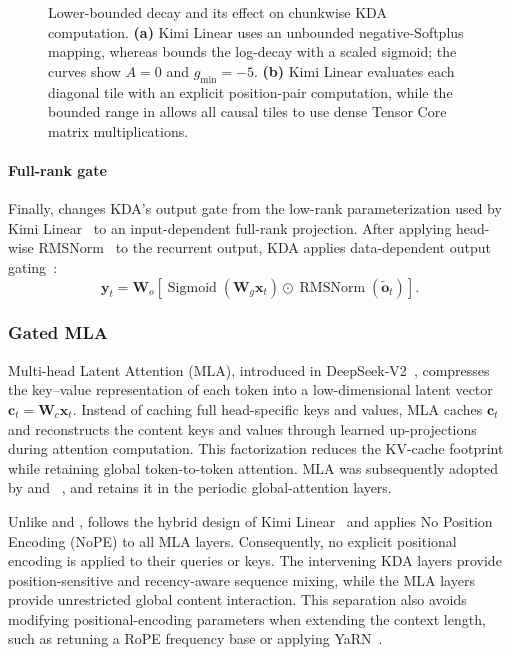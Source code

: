 \begin{figure}[t]
    \centering
    
    \caption{Lower-bounded decay and its effect on chunkwise KDA computation.
        \textbf{(a)} Kimi Linear uses an unbounded negative-Softplus mapping, whereas  bounds the log-decay with a scaled sigmoid; the curves show $A=0$ and $g_{\min}=-5$.
        \textbf{(b)} Kimi Linear evaluates each diagonal tile with an explicit position-pair computation, while the bounded range in  allows all causal tiles to use dense Tensor Core matrix multiplications.}
    \label{fig:kda-lower-bound}
\end{figure}

\paragraph{Full-rank gate}
Finally,  changes KDA's output gate from the low-rank parameterization used by Kimi Linear~\citep{team2025kimi} to an input-dependent full-rank projection.
After applying head-wise RMSNorm~\citep{zhang2019root} to the recurrent output, KDA applies data-dependent output gating~\citep{qiu2025gated}:
\begin{equation}
    \bm{y}_t
    = \mathbf{W}_o\!\left[
        \operatorname{Sigmoid}\!\left(\mathbf{W}_g\bm{x}_t\right)
        \odot \operatorname{RMSNorm}(\tilde{\bm{o}}_t)
        \right].
    \label{eq:kda-output}
\end{equation}

\subsubsection{Gated MLA}
\label{sec:gated-mla}

Multi-head Latent Attention (MLA), introduced in DeepSeek-V2~\citep{deepseekv2}, compresses the key--value representation of each token into a low-dimensional latent vector $\bm{c}_t=\mathbf{W}_{c}\bm{x}_t$.
Instead of caching full head-specific keys and values, MLA caches $\bm{c}_t$ and reconstructs the content keys and values through learned up-projections during attention computation.
This factorization reduces the KV-cache footprint while retaining global token-to-token attention.
MLA was subsequently adopted by  and ~\citep{kimiteam2025kimik2openagentic,kimik25}, and  retains it in the periodic global-attention layers.

Unlike  and ,  follows the hybrid design of Kimi Linear~\citep{team2025kimi} and applies No Position Encoding (NoPE) to all MLA layers.
Consequently, no explicit positional encoding is applied to their queries or keys.
The intervening KDA layers provide position-sensitive and recency-aware sequence mixing, while the MLA layers provide unrestricted global content interaction.
This separation also avoids modifying positional-encoding parameters when extending the context length, such as retuning a RoPE frequency base or applying YaRN~\citep{peng2023yarn}.

